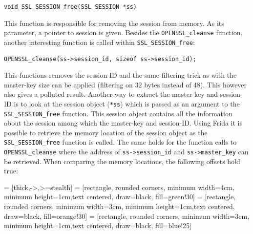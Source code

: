 \documentclass[12pt, a4paper]{report}
\begin{document}
\begin{lstlisting}[frame=single, breaklines=true]
void SSL_SESSION_free(SSL_SESSION *ss)
\end{lstlisting}

This function is responsible for removing the session from memory. As its parameter, a pointer to session is given. Besides the \texttt{OPENSSL\_cleanse} function, another interesting function is called within \texttt{SSL\_SESSION\_free}:
\\
\begin{lstlisting}[frame=single, breaklines=true]
OPENSSL_cleanse(ss->session_id, sizeof ss->session_id);
\end{lstlisting}

This functions removes the session-ID and the same filtering trick as with the master-key size can be applied (filtering on 32 bytes instead of 48). This however also gives a polluted result.
\newline
\newline
\noindent Another way to extract the master-key and session-ID is to look at the session object (\texttt{*ss}) which is passed as an argument to the \texttt{SSL\_SESSION\_free} function. This session object contains all the information about the session among which the master-key and session-ID. Using Frida it is possible to retrieve the memory location of the session object as the \texttt{SSL\_SESSION\_free} function is called. The same holds for the function calls to \texttt{OPENSSL\_cleanse} where the address of \texttt{ss->session\_id} and \texttt{ss->master\_key} can be retrieved. When comparing the memory locations, the following offsets hold true:

 = [thick,->,>=stealth]
 = [rectangle, rounded corners, minimum width=4cm, minimum height=1cm,text centered, draw=black, fill=green!30]
 = [rectangle, rounded corners, minimum width=3cm, minimum height=1cm,text centered, draw=black, fill=orange!30]
 = [rectangle, rounded corners, minimum width=3cm, minimum height=1cm,text centered, draw=black, fill=blue!25]
\end{document}
